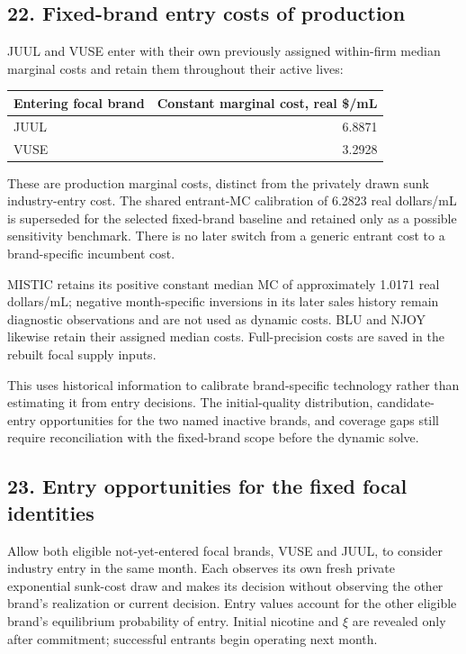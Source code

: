 \documentclass[10pt,]{article}
\begin{document}
\subsection{22. Fixed-brand entry costs of
production}\label{fixed-brand-entry-costs-of-production}

JUUL and VUSE enter with their own previously assigned within-firm
median marginal costs and retain them throughout their active lives:

\begin{longtable}[]{@{}lr@{}}
\toprule
Entering focal brand & Constant marginal cost, real \$/mL\tabularnewline
\midrule
\endhead
JUUL & 6.8871\tabularnewline
VUSE & 3.2928\tabularnewline
\bottomrule
\end{longtable}

These are production marginal costs, distinct from the privately drawn
sunk industry-entry cost. The shared entrant-MC calibration of 6.2823
real dollars/mL is superseded for the selected fixed-brand baseline and
retained only as a possible sensitivity benchmark. There is no later
switch from a generic entrant cost to a brand-specific incumbent cost.

MISTIC retains its positive constant median MC of approximately 1.0171
real dollars/mL; negative month-specific inversions in its later sales
history remain diagnostic observations and are not used as dynamic
costs. BLU and NJOY likewise retain their assigned median costs.
Full-precision costs are saved in the rebuilt focal supply inputs.

This uses historical information to calibrate brand-specific technology
rather than estimating it from entry decisions. The initial-quality
distribution, candidate-entry opportunities for the two named inactive
brands, and coverage gaps still require reconciliation with the
fixed-brand scope before the dynamic solve.

\subsection{23. Entry opportunities for the fixed focal
identities}\label{entry-opportunities-for-the-fixed-focal-identities}

Allow both eligible not-yet-entered focal brands, VUSE and JUUL, to
consider industry entry in the same month. Each observes its own fresh
private exponential sunk-cost draw and makes its decision without
observing the other brand's realization or current decision. Entry
values account for the other eligible brand's equilibrium probability of
entry. Initial nicotine and \(\xi\) are revealed only after commitment;
successful entrants begin operating next month.
\end{document}

